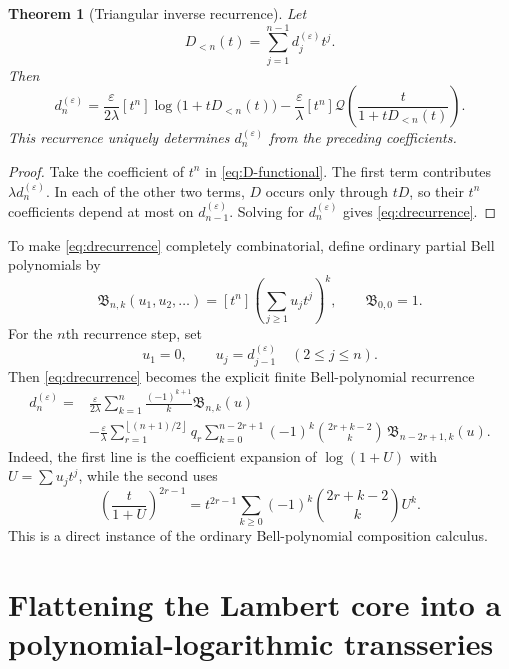 \documentclass[11pt]{article}
\newtheorem{theorem}{Theorem}[section]
\theoremstyle{definition}
\theoremstyle{remark}
\newcommand{\eps}{\varepsilon}
\newcommand{\lam}{\lambda}
\newcommand{\Qf}{\mathcal Q}
\newcommand{\BellOrd}{\mathfrak B}
\newcommand{\floor}[1]{\left\lfloor #1\right\rfloor}
\begin{document}
\begin{theorem}[Triangular inverse recurrence]\label{thm:drecurrence}
Let
\[
 D_{<n}(t)=\sum_{j=1}^{n-1}d_j^{(\eps)}t^j.
\]
Then
\begin{equation}\label{eq:drecurrence}
 d_n^{(\eps)}=
 \frac\eps{2\lam}[t^n]\log\bigl(1+tD_{<n}(t)\bigr)
 -\frac\eps\lam[t^n]\Qf\!\left(\frac{t}{1+tD_{<n}(t)}\right).
\end{equation}
This recurrence uniquely determines $d_n^{(\eps)}$ from the preceding coefficients.
\end{theorem}

\begin{proof}
Take the coefficient of $t^n$ in \eqref{eq:D-functional}.  The first term contributes $\lam d_n^{(\eps)}$.  In each of the other two terms, $D$ occurs only through $tD$, so their $t^n$ coefficients depend at most on $d_{n-1}^{(\eps)}$.  Solving for $d_n^{(\eps)}$ gives \eqref{eq:drecurrence}.
\end{proof}

To make \eqref{eq:drecurrence} completely combinatorial, define ordinary partial Bell polynomials by
\begin{equation}\label{eq:ordinary-Bell}
 \BellOrd_{n,k}(u_1,u_2,\ldots)
 =[t^n]\left(\sum_{j\ge1}u_jt^j\right)^k,
 \qquad \BellOrd_{0,0}=1.
\end{equation}
For the $n$th recurrence step, set
\begin{equation}\label{eq:u-from-d}
 u_1=0,
 \qquad u_j=d_{j-1}^{(\eps)}\quad(2\le j\le n).
\end{equation}
Then \eqref{eq:drecurrence} becomes the explicit finite Bell-polynomial recurrence
\begin{equation}\label{eq:d-Bell-recurrence}
\begin{split}
 d_n^{(\eps)}={}&
 \frac\eps{2\lam}
 \sum_{k=1}^{n}\frac{(-1)^{k+1}}{k}\BellOrd_{n,k}(u)\\
 &-\frac\eps\lam
 \sum_{r=1}^{\floor{(n+1)/2}}q_r
 \sum_{k=0}^{n-2r+1}(-1)^k
 \binom{2r+k-2}{k}\,
 \BellOrd_{n-2r+1,k}(u).
\end{split}
\end{equation}
Indeed, the first line is the coefficient expansion of $\log(1+U)$ with $U=\sum u_jt^j$, while the second uses
\[
 \left(\frac{t}{1+U}\right)^{2r-1}
 =t^{2r-1}\sum_{k\ge0}(-1)^k
 \binom{2r+k-2}{k}U^k.
\]
This is a direct instance of the ordinary Bell-polynomial composition calculus.

\section{Flattening the Lambert core into a polynomial-logarithmic transseries}
\end{document}
